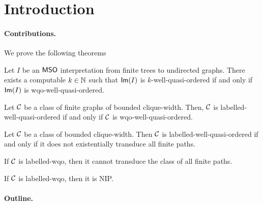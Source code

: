 \section{Introduction}
\label{sec:introduction}

\paragraph*{Contributions.}
We prove the following theorems

\begin{theorem}
    \label{effective-image:thm}
    Let $I$ be an $\mathsf{MSO}$ interpretation
    from finite trees to undirected graphs.
    There exists a computable $k \in \mathbb{N}$
    such that $\mathsf{Im}(I)$
    is $k$-well-quasi-ordered
    if and only if 
    $\mathsf{Im}(I)$ is wqo-well-quasi-ordered.
\end{theorem}

\begin{theorem}
    \label{pouzet-2:thm}
    Let $\mathcal{C}$ be a class of finite graphs of bounded clique-width.
    Then, $\mathcal{C}$ is labelled-well-quasi-ordered
    if and only if 
    $\mathcal{C}$ is wqo-well-quasi-ordered.
\end{theorem}

\begin{theorem}
    \label{transductions-paths:thm}
    Let $\mathcal{C}$ be a class of bounded clique-width.
    Then $\mathcal{C}$ is labelled-well-quasi-ordered
    if and only if
    it does not existentially transduce
    all finite paths.
\end{theorem}

\begin{remark}
    \label{transductions-paths:rem}
    If $\mathcal{C}$ is labelled-wqo, then it cannot transduce
    the class of all finite paths.
\end{remark}

\begin{remark}
    If $\mathcal{C}$ is labelled-wqo, then it is NIP.
\end{remark}

\paragraph*{Outline.}

